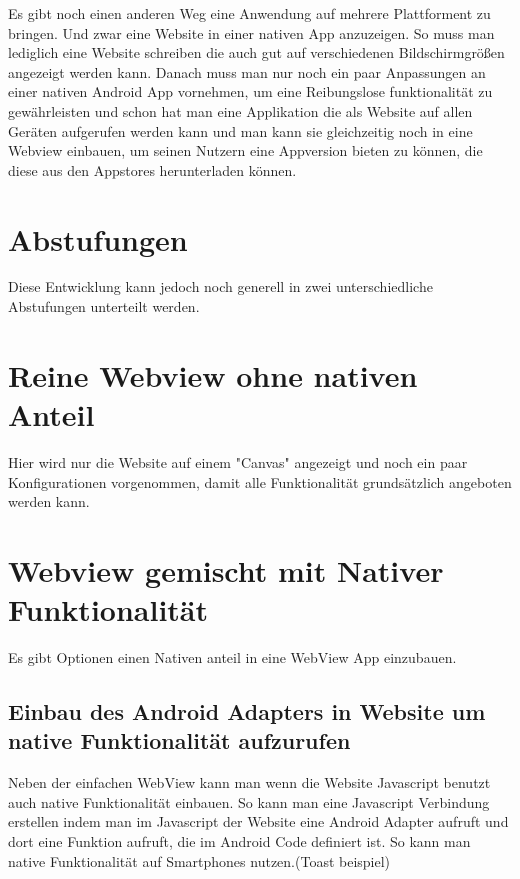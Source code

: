 Es gibt noch einen anderen Weg eine Anwendung auf mehrere Plattforment zu bringen.
Und zwar eine Website in einer nativen App anzuzeigen. So muss man lediglich eine Website schreiben die auch gut auf verschiedenen Bildschirmgrößen angezeigt werden kann. Danach muss man nur noch ein paar Anpassungen an einer nativen Android App vornehmen, um eine Reibungslose funktionalität zu gewährleisten und schon hat man eine Applikation die als Website auf allen Geräten aufgerufen werden kann und man kann sie gleichzeitig noch in eine Webview einbauen, um seinen Nutzern eine Appversion bieten zu können, die diese aus den Appstores herunterladen können.
\section{Abstufungen}
Diese Entwicklung kann jedoch noch generell in zwei unterschiedliche Abstufungen unterteilt werden. 
\section{Reine Webview ohne nativen Anteil}
Hier wird nur die Website auf einem "Canvas" angezeigt und noch ein paar Konfigurationen vorgenommen, damit alle Funktionalität grundsätzlich angeboten werden kann.

\section{Webview gemischt mit Nativer Funktionalität}
Es gibt Optionen einen Nativen anteil in eine WebView App einzubauen.
\subsection{Einbau des Android Adapters in Website um native Funktionalität aufzurufen}
Neben der einfachen WebView kann man wenn die Website Javascript benutzt auch native Funktionalität einbauen. So kann man eine Javascript Verbindung erstellen indem man im Javascript der Website eine Android Adapter aufruft und dort eine Funktion aufruft, die im Android Code definiert ist. So kann man native Funktionalität auf Smartphones nutzen.(Toast beispiel)

